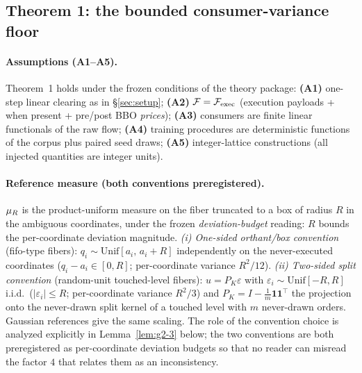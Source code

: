 \subsection{Theorem 1: the bounded consumer-variance floor}
\label{sec:t2-floor}

\paragraph{Assumptions (A1--A5).} Theorem~1 holds under the frozen conditions
of the theory package: \textbf{(A1)} one-step linear clearing as in
\S\ref{sec:setup}; \textbf{(A2)} $\mathcal{F} = \mathcal{F}_{\mathrm{exec}}$ (execution payloads +
 when present + pre/post BBO \emph{prices}); \textbf{(A3)}
consumers are finite linear functionals of the raw flow; \textbf{(A4)} training
procedures are deterministic functions of the corpus plus paired seed draws;
\textbf{(A5)} integer-lattice constructions (all injected quantities are
integer units).

\paragraph{Reference measure (both conventions preregistered).} $\mu_{R}$ is the
product-uniform measure on the fiber truncated to a box of radius $R$ in the
ambiguous coordinates, under the frozen \emph{deviation-budget} reading:
$R$ bounds the per-coordinate deviation magnitude.
\emph{(i) One-sided orthant/box convention} (fifo-type fibers):
$q_i \sim \mathrm{Unif}[a_i,\,a_i+R]$ independently on the never-executed
coordinates ($q_i - a_i \in [0,R]$; per-coordinate variance $R^2/12$).
\emph{(ii) Two-sided split convention} (random-unit touched-level fibers):
$u = P_K\varepsilon$ with $\varepsilon_i \sim \mathrm{Unif}[-R,R]$ i.i.d.\
($|\varepsilon_i| \le R$; per-coordinate variance $R^2/3$) and
$P_K = I - \tfrac{1}{m}\mathbf{1}\mathbf{1}^{\top}$ the projection onto the
never-drawn split kernel of a touched level with $m$ never-drawn orders.
Gaussian references give the same scaling. The role of the convention choice
is analyzed explicitly in Lemma~\ref{lem:g2-3} below; the two conventions are
both preregistered as per-coordinate deviation budgets so that no reader can
misread the factor $4$ that relates them as an inconsistency.

